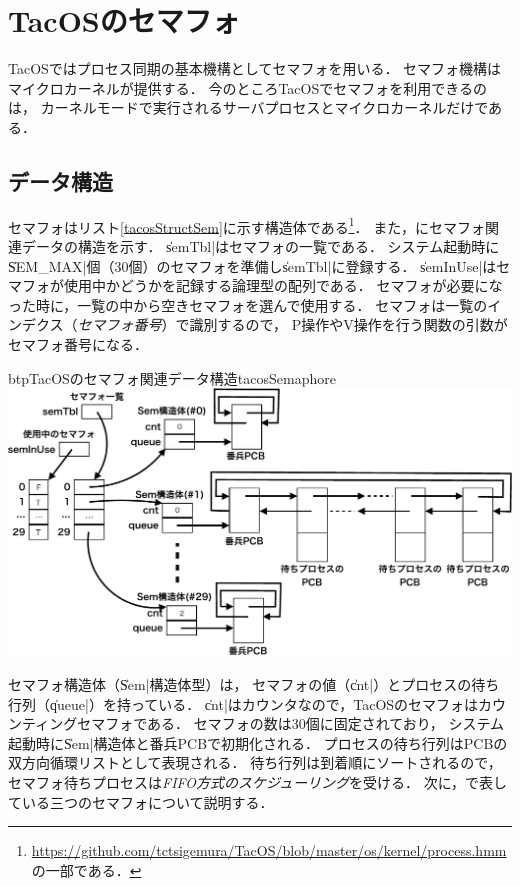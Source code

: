 \chapter{TacOSのセマフォ}
\label{tacosImpSemaphore}
TacOSではプロセス同期の基本機構としてセマフォを用いる．
セマフォ機構はマイクロカーネルが提供する．
今のところTacOSでセマフォを利用できるのは，
カーネルモードで実行されるサーバプロセスとマイクロカーネルだけである．

\section{データ構造}
セマフォはリスト\ref{tacosStructSem}に示す構造体である\footnote{
  \url{https://github.com/tctsigemura/TacOS/blob/master/os/kernel/process.hmm}
  の一部である．}．
また，にセマフォ関連データの構造を示す．
\|semTbl|はセマフォの一覧である．
システム起動時に\|SEM_MAX|個（30個）のセマフォを準備し\|semTbl|に登録する．
\|semInUse|はセマフォが使用中かどうかを記録する論理型の配列である．
セマフォが必要になった時に，一覧の中から空きセマフォを選んで使用する．
セマフォは一覧のインデクス（\emph{セマフォ番号}）で識別するので，
P操作やV操作を行う関数の引数がセマフォ番号になる．



\begin{myfig}{btp}{TacOSのセマフォ関連データ構造}{tacosSemaphore}
  \includegraphics[scale=0.66]{Fig/tacosSemaphore-crop.pdf}
\end{myfig}

セマフォ構造体（\|Sem|構造体型）は，
セマフォの値（\|cnt|）とプロセスの待ち行列（\|queue|）を持っている．
\|cnt|はカウンタなので，TacOSのセマフォはカウンティングセマフォである．
セマフォの数は30個に固定されており，
システム起動時に\|Sem|構造体と番兵PCBで初期化される．
プロセスの待ち行列はPCBの双方向循環リストとして表現される．
待ち行列は到着順にソートされるので，
セマフォ待ちプロセスは\emph{FIFO方式のスケジューリング}を受ける．
次に，で表している三つのセマフォについて説明する．

